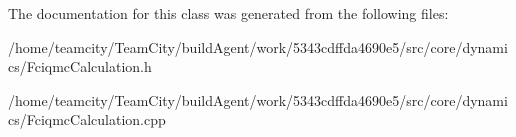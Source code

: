 The documentation for this class was generated from the following files\+:\begin{DoxyCompactItemize}
\item 
/home/teamcity/\+Team\+City/build\+Agent/work/5343cdffda4690e5/src/core/dynamics/Fciqmc\+Calculation.\+h\item 
/home/teamcity/\+Team\+City/build\+Agent/work/5343cdffda4690e5/src/core/dynamics/Fciqmc\+Calculation.\+cpp\end{DoxyCompactItemize}
